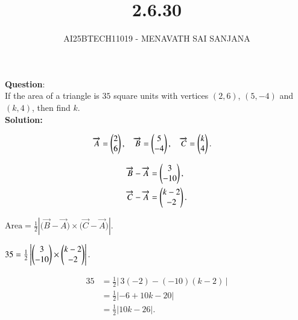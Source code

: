 \documentclass[journal]{IEEEtran}
\begin{document}

\vspace{3cm}

\title{2.6.30}
\author{AI25BTECH11019 - MENAVATH SAI SANJANA}
{\let\newpage\relax\maketitle}

\renewcommand{\thefigure}{\theenumi}
\renewcommand{\thetable}{\theenumi}
\setlength{\intextsep}{10pt} %


\renewcommand{\thetable}{\theenumi}

\textbf{Question}:\\
If the area of a triangle is $35$ square units with vertices $(2,6)$, $(5,-4)$ and $(k,4)$, then find $k$. 
\\
\bigskip
\textbf{Solution: }

\begin{align}
\overrightarrow{A} &= \begin{pmatrix}2\\6\end{pmatrix}, \quad
\overrightarrow{B} = \begin{pmatrix}5\\-4\end{pmatrix}, \quad
\overrightarrow{C} = \begin{pmatrix}k\\4\end{pmatrix}.
\end{align}

\begin{align}
\overrightarrow{B}-\overrightarrow{A} &= \begin{pmatrix}3\\-10\end{pmatrix}, \\
\overrightarrow{C}-\overrightarrow{A} &= \begin{pmatrix}k-2\\-2\end{pmatrix}.
\end{align}

$
\text{Area}=\frac{1}{2}\left|\bigl(\overrightarrow{B}-\overrightarrow{A}\bigr)\times\bigl(\overrightarrow{C}-\overrightarrow{A}\bigr)\right|.
$

$
35=\frac{1}{2}\left|\begin{pmatrix}3\\-10\end{pmatrix}\times\begin{pmatrix}k-2\\-2\end{pmatrix}\right|.
$

\begin{align}
35 &= \frac{1}{2}\left|\,3(-2)-(-10)(k-2)\,\right| \\
&= \frac{1}{2}\left|-6+10k-20\right| \\
&= \frac{1}{2}\left|10k-26\right|.
\end{align}
\end{document}
